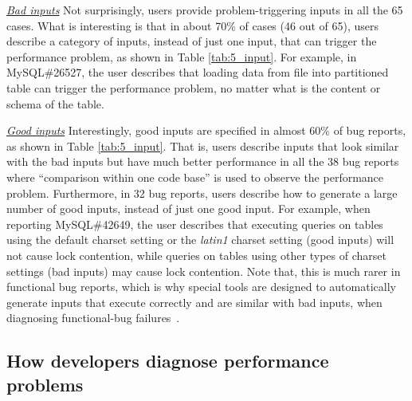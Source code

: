 \underline{\it Bad inputs} Not surprisingly, users provide problem-triggering
inputs in all the 65 cases. What is interesting is that in about 70\% of
cases (46 out of 65), users describe a category of inputs, instead of just
one input, that can trigger
the performance problem, as shown in Table \ref{tab:5_input}. For example,
in MySQL\#26527, the user describes that loading data from file into partitioned
table can trigger the performance problem, no matter what is the content or 
schema of the table. 

\underline{\it Good inputs} Interestingly, good inputs are specified in almost
60\% of bug reports, as shown in Table \ref{tab:5_input}. 
That is, users describe inputs that look similar with the
bad inputs but have much better performance in all the 38 bug reports
where ``comparison within one code base'' is used to observe the performance
problem.
Furthermore,
in 32 bug reports, users describe how to generate a large number of good
inputs, instead of just one good input.
For example, when reporting MySQL\#42649, the user
describes that executing queries on tables using the default charset setting or
the \textit{latin1} charset setting (good inputs) will not cause lock contention, while queries
on tables using other types of charset settings (bad inputs) may cause lock contention.
Note that, this is much rarer in functional bug reports, which is why special
tools are
designed to automatically generate inputs that execute correctly
and are similar with bad inputs, when diagnosing functional-bug failures~\citep{delta}.




\subsection{How developers diagnose performance problems}

